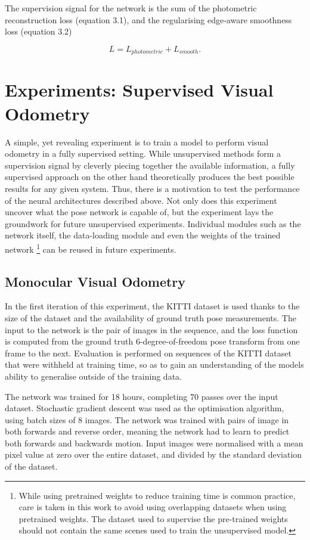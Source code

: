 \documentclass[openany]{book}
\begin{document}
The supervision signal for the network is the sum of the photometric reconstruction loss (equation 3.1), and the regularising edge-aware smoothness loss (equation 3.2)

\begin{equation}
    L = L_{photometric} + L_{smooth}.
\end{equation}



\section{Experiments: Supervised Visual Odometry}

A simple, yet revealing experiment is to train a model to perform visual odometry in a fully supervised setting. While unsupervised methods form a supervision signal by cleverly piecing together the available information, a fully supervised approach on the other hand theoretically produces the best possible results for any given system. Thus, there is a motivation to test the performance of the neural architectures described above. Not only does this experiment uncover what the pose network is capable of, but the experiment lays the groundwork for future unsupervised experiments. Individual modules such as the network itself, the data-loading module and even the weights of the trained network \footnote{While using pretrained weights to reduce training time is common practice, care is taken in this work to avoid using overlapping datasets when using pretrained weights. The dataset used to supervise the pre-trained weights should not contain the same scenes used to train the unsupervised model.} can be reused in future experiments. 

\subsection{Monocular Visual Odometry}

In the first iteration of this experiment, the KITTI dataset is used thanks to the size of the dataset and the availability of ground truth pose measurements. The input to the network is the pair of images in the sequence, and the loss function is computed from the ground truth 6-degree-of-freedom pose transform from one frame to the next. Evaluation is performed on sequences of the KITTI dataset that were withheld at training time, so as to gain an understanding of the models ability to generalise outside of the training data. 

The network was trained for 18 hours, completing 70 passes over the input dataset. Stochastic gradient descent was used as the optimisation algorithm, using batch sizes of 8 images. The network was trained with pairs of image in both forwards and reverse order, meaning the network had to learn to predict both forwards and backwards motion. Input images were normalised with a mean pixel value at zero over the entire dataset, and divided by the standard deviation of the dataset. 
\end{document}
